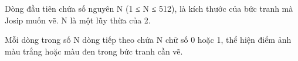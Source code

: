 Dòng đầu tiên chứa số nguyên N (1 ≤ N ≤ 512), là kích thước của bức tranh mà Josip muốn vẽ. N là một lũy thừa của 2.  

   Mỗi dòng trong số N dòng tiếp theo chứa N chữ số 0 hoặc 1, thể hiện điểm ảnh màu trắng hoặc màu đen trong bức tranh cần vẽ.